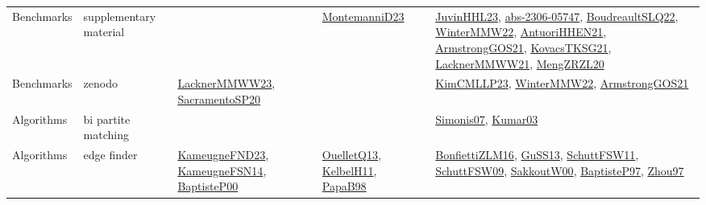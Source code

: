 {\begin{longtable}{llp{6cm}p{6cm}p{6cm}}
Benchmarks & supplementary material &  & \href{articles/MontemanniD23.pdf}{MontemanniD23}\cite{MontemanniD23} & \href{papers/JuvinHHL23.pdf}{JuvinHHL23}\cite{JuvinHHL23}, \href{articles/abs-2306-05747.pdf}{abs-2306-05747}\cite{abs-2306-05747}, \href{papers/BoudreaultSLQ22.pdf}{BoudreaultSLQ22}\cite{BoudreaultSLQ22}, \href{papers/WinterMMW22.pdf}{WinterMMW22}\cite{WinterMMW22}, \href{papers/AntuoriHHEN21.pdf}{AntuoriHHEN21}\cite{AntuoriHHEN21}, \href{papers/ArmstrongGOS21.pdf}{ArmstrongGOS21}\cite{ArmstrongGOS21}, \href{papers/KovacsTKSG21.pdf}{KovacsTKSG21}\cite{KovacsTKSG21}, \href{papers/LacknerMMWW21.pdf}{LacknerMMWW21}\cite{LacknerMMWW21}, \href{articles/MengZRZL20.pdf}{MengZRZL20}\cite{MengZRZL20}\\
Benchmarks & zenodo & \href{articles/LacknerMMWW23.pdf}{LacknerMMWW23}\cite{LacknerMMWW23}, \href{articles/SacramentoSP20.pdf}{SacramentoSP20}\cite{SacramentoSP20} &  & \href{papers/KimCMLLP23.pdf}{KimCMLLP23}\cite{KimCMLLP23}, \href{papers/WinterMMW22.pdf}{WinterMMW22}\cite{WinterMMW22}, \href{papers/ArmstrongGOS21.pdf}{ArmstrongGOS21}\cite{ArmstrongGOS21}\\
Algorithms & bi partite matching &  &  & \href{articles/Simonis07.pdf}{Simonis07}\cite{Simonis07}, \href{papers/Kumar03.pdf}{Kumar03}\cite{Kumar03}\\
Algorithms & edge finder & \href{papers/KameugneFND23.pdf}{KameugneFND23}\cite{KameugneFND23}, \href{articles/KameugneFSN14.pdf}{KameugneFSN14}\cite{KameugneFSN14}, \href{articles/BaptisteP00.pdf}{BaptisteP00}\cite{BaptisteP00} & \href{papers/OuelletQ13.pdf}{OuelletQ13}\cite{OuelletQ13}, \href{articles/KelbelH11.pdf}{KelbelH11}\cite{KelbelH11}, \href{articles/PapaB98.pdf}{PapaB98}\cite{PapaB98} & \href{papers/BonfiettiZLM16.pdf}{BonfiettiZLM16}\cite{BonfiettiZLM16}, \href{papers/GuSS13.pdf}{GuSS13}\cite{GuSS13}, \href{articles/SchuttFSW11.pdf}{SchuttFSW11}\cite{SchuttFSW11}, \href{papers/SchuttFSW09.pdf}{SchuttFSW09}\cite{SchuttFSW09}, \href{articles/SakkoutW00.pdf}{SakkoutW00}\cite{SakkoutW00}, \href{papers/BaptisteP97.pdf}{BaptisteP97}\cite{BaptisteP97}, \href{articles/Zhou97.pdf}{Zhou97}\cite{Zhou97}\\

\end{longtable}}
